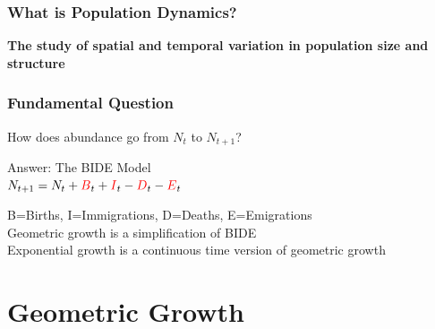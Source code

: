 \documentclass[color=usenames,dvipsnames]{beamer}\usepackage[]{graphicx}\usepackage[]{color}
\begin{document}




\begin{frame}
  \frametitle{What is Population Dynamics?}
  {\centering \Large \bf The study of spatial and temporal variation in
    population size and structure \\ }
\end{frame}






\begin{frame}%
  \frametitle{Fundamental Question}
  \begin{center}
   { \Large How does abundance go from $N_t$ to $N_{t+1}$?} \par
   \vspace{1.5cm}
   \large
   \pause
   Answer: The {\color{red} BIDE} Model  \\
     $N_{t+1} = N_t + {\color{red}B}_t + {\color{red}I}_t - {\color{red}D}_t - {\color{red}E}_t$
  \vspace{2mm}
  \end{center}
  B=Births, I=Immigrations, D=Deaths, E=Emigrations \\
  \pause
  \vfill
  Geometric growth is a simplification of BIDE \\
  \pause
  \vfill
  Exponential growth is a continuous time version of geometric growth
\end{frame}



\section{Geometric Growth}



\end{document}
